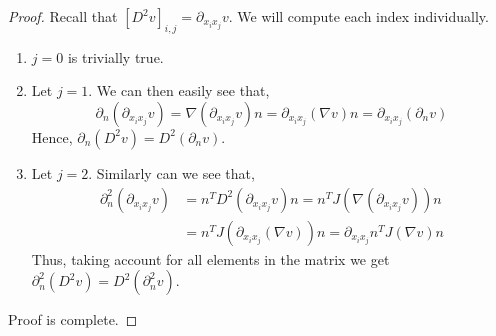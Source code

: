 \begin{proof}
        Recall that $\left[ D^2 v \right]_{i,j} = \partial _{x_{i}x_{j}} v $. We will compute each index individually.
    \begin{enumerate}[label=\arabic*)]
        \item $j = 0$ is trivially true.
        \item Let $j=1$. We can then easily see that, \[
        \partial ^{}_{n} ( \partial _{x_{i} x_{j}} v)  = \nabla  ( \partial _{x_{i} x_{j}} v)   n = \partial _{x_{i} x_{j}} (\nabla  v) n =\partial _{x_{i} x_{j}} (\partial _{n} v)
        \]
        Hence, $\partial _{n} (D^2v) = D^2( \partial _{n}v)$.
        \item Let $j=2$. Similarly can we see that, \[
                \begin{split}
                \partial^{2} _{n} (\partial _{x_{i} x_{j}} v) & = n^{T}  D^2(\partial _{x_{i} x_{j}} v) n = n^{T}  J( \nabla (\partial _{x_{i} x_{j}}v) ) n \\
                & =  n^{T}  J(\partial _{x_{i} x_{j}}(\nabla v) ) n = \partial _{x_{i} x_{j}} n^{T} J(\nabla v) n
                \end{split}
            \]
            Thus, taking account for all elements in the matrix we get $\partial^{2} _{n} (D^2v) = D^2( \partial^{2} _{n}v)$.
    \end{enumerate}
    Proof is complete.

\end{proof}


